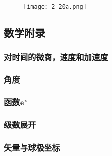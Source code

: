 \begin{figure}[htbp]
	\centering
	\texttt{[image: 2\_20a.png]}
	\caption{}
	\label{2_20a}
\end{figure}
\subsection{数学附录}
\subsubsection{对时间的微商，速度和加速度}
\subsubsection{角度}
\subsubsection{函数$\bm{e^x}$}
\subsubsection{级数展开}
\subsubsection{矢量与球极坐标}





